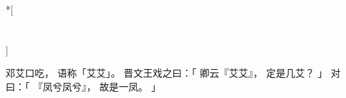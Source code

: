 
\switchcolumn[0]*[\section{}]

邓艾口吃，
语称「艾艾」。
晋文王戏之曰：「
    卿云『艾艾』，
    定是几艾？
」
对曰：「
    『凤兮凤兮』，
    故是一凤。
」

\switchcolumn



